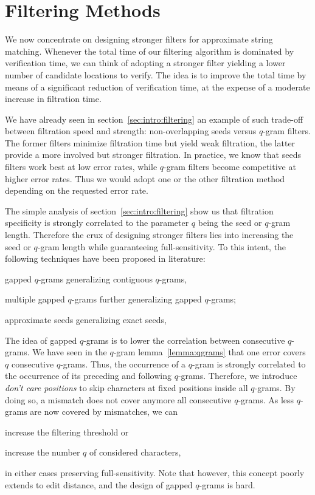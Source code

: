 \chapter{Filtering Methods}

We now concentrate on designing stronger filters for approximate string matching.
Whenever the total time of our filtering algorithm is dominated by verification time, we can think of adopting a stronger filter yielding a lower number of candidate locations to verify.
The idea is to improve the total time by means of a significant reduction of verification time, at the expense of a moderate increase in filtration time.

We have already seen in section~\ref{sec:intro:filtering} an example of such trade-off between filtration speed and strength: non-overlapping seeds versus $q$-gram filters.
The former filters minimize filtration time but yield weak filtration, the latter provide a more involved but stronger filtration.
In practice, we know that seeds filters work best at low error rates, while $q$-gram filters become competitive at higher error rates.
Thus we would adopt one or the other filtration method depending on the requested error rate.

The simple analysis of section~\ref{sec:intro:filtering} show us that filtration specificity is strongly correlated to the parameter $q$ being the seed or $q$-gram length.
Therefore the crux of designing stronger filters lies into increasing the seed or $q$-gram length while guaranteeing full-sensitivity.
To this intent, the following techniques have been proposed in literature:
\begin{inparaenum}[(i)]
\item gapped $q$-grams generalizing contiguous $q$-grams,
\item multiple gapped $q$-grams further generalizing gapped $q$-grams;
\item approximate seeds generalizing exact seeds,
\end{inparaenum}

The idea of gapped $q$-grams is to lower the correlation between consecutive $q$-grams.
We have seen in the $q$-gram lemma~\ref{lemma:qgrams} that one error covers $q$ consecutive $q$-grams.
Thus, the occurrence of a $q$-gram is strongly correlated to the occurrence of its preceding and following $q$-grams.
Therefore, we introduce \emph{don't care positions} to skip characters at fixed positions inside all $q$-grams.
By doing so, a mismatch does not cover anymore all consecutive $q$-grams.
As less $q$-grams are now covered by mismatches, we can
\begin{inparaenum}[(i)]
\item increase the filtering threshold or
\item increase the number $q$ of considered characters,
\end{inparaenum}
in either cases preserving full-sensitivity.
Note that however, this concept poorly extends to edit distance, and the design of gapped $q$-grams is hard.

